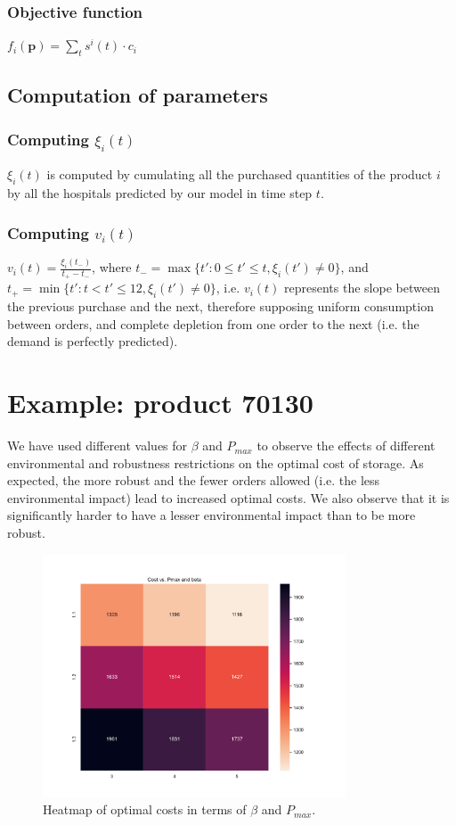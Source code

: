 \documentclass[11pt,twocolumn]{article}
\begin{document}
\subsubsection{Objective function}
\hspace{4mm} $ f_i(\mathbf{p}) = \sum_{t}^{} s^{i}\left( t \right) \cdot c_i$

\subsection{Computation of parameters}
\subsubsection{Computing $\xi_i(t)$}
$\xi_i(t)$ is computed by cumulating all the purchased quantities of the product $i$ by all the hospitals predicted by our model in time step $t$.

\subsubsection{Computing $v_i(t)$}
$v_i(t)=\frac{\xi_i(t_-)}{t_+-t_-}$, where $t_-=\max\{t': 0\leq t'\leq t, \xi_i(t') \neq 0\}$, and $t_+=\min\{t':t<t'\leq 12, \xi_i(t')\neq 0\}$, i.e. $v_i(t)$ represents the slope between the previous purchase and the next, therefore supposing uniform consumption between orders, and complete depletion from one order to the next (i.e. the demand is perfectly predicted).


\section{Example: product 70130}

We have used different values for $\beta$ and $P_{max}$ to observe the effects of different environmental and robustness restrictions on the optimal cost of storage. As expected, the more robust and the fewer orders allowed (i.e. the less environmental impact) lead to increased optimal costs. We also observe that it is significantly harder to have a lesser environmental impact than to be more robust.

\begin{figure}[ht]
	\centering
	\includegraphics[width=9cm]{heatmap.pdf}
	\caption{Heatmap of optimal costs in terms of $\beta$ and $P_{max}$.}
	\label{fig:enter-label2}
\end{figure}
\end{document}
